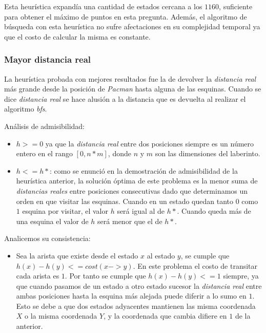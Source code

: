 \documentclass[12pt]{article}
\begin{document}
Esta heur\'istica expand\'ia una cantidad de estados cercana a los $1160$, suficiente para obtener el m\'aximo de puntos en esta pregunta. Adem\'as, el algoritmo de b\'usqueda con esta heur\'istica no sufre afectaciones en su complejidad temporal ya que el costo de calcular la misma es constante.


\subsubsection{Mayor distancia real}

La heur\'istica probada con mejores resultados fue la de devolver la \emph{distancia real} m\'as grande desde la posici\'on de \emph{Pacman} hasta alguna de las esquinas. Cuando se dice \emph{distancia real} se hace alusi\'on a la distancia que es devuelta al realizar el algoritmo \emph{bfs}.

An\'alisis de admisibilidad:

\begin{itemize}
\item $h >= 0$ ya que la \emph{distancia real} entre dos posiciones siempre es un n\'umero entero en el rango $[0, n * m]$, donde $n$ y $m$ son las dimensiones del laberinto.

\item $h <= h*$: como se enunci\'o en la demostraci\'on de admisibilidad de la heur\'istica anterior, la soluci\'on \'optima de este problema es la menor suma de \emph{distancias reales} entre posiciones consecutivas dado que determinamos un orden en que visitar las esquinas. Cuando en un estado quedan tanto $0$ como $1$ esquina por visitar, el valor $h$ ser\'a igual al de $h*$. Cuando queda m\'as de una esquina el valor de $h$ ser\'a menor que el de $h*$.


\end{itemize}

Analicemos su consistencia:

\begin{itemize}
\item Sea la arista que existe desde el estado $x$ al estado $y$, se cumple que $h(x) - h(y) <= cost(x->y)$. En este problema el costo de transitar cada arista es $1$. Por tanto se cumple que $h(x) - h(y) <= 1$ siempre, ya que cuando pasamos de un estado a otro estado sucesor la \emph{distancia real} entre ambas posiciones hasta la esquina m\'as alejada puede diferir a lo sumo en $1$. Esto se debe a que dos estados adyacentes mantienen las misma coordenada $X$ o la misma coordenada $Y$, y la coordenada que cambia difiere en $1$ de la anterior.

\end{itemize}
\end{document}

